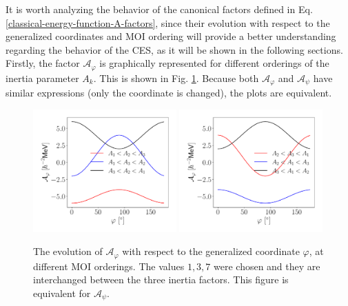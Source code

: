 It is worth analyzing the behavior of the canonical factors defined in Eq. \ref{classical-energy-function-A-factors}, since their evolution with respect to the generalized coordinates and MOI ordering will provide a better understanding regarding the behavior of the CES, as it will be shown in the following sections. Firstly, the factor $\mathcal{A}_\varphi$ is graphically represented for different orderings of the inertia parameter $A_k$. This is shown in Fig. \ref{fig-A-varphi-canonical}. Because both $\mathcal{A}_\varphi$ and $\mathcal{A}_\psi$ have similar expressions (only the coordinate is changed), the plots are equivalent.
\begin{figure}
    \centering
    \includegraphics[width=0.49\textwidth]{Chapters/Figures/A_varphi_1.pdf}
    \includegraphics[width=0.49\textwidth]{Chapters/Figures/A_varphi_2.pdf}
    \caption{The evolution of $\mathcal{A}_\varphi$ with respect to the generalized coordinate $\varphi$, at different MOI orderings. The values $1,3,7$ were chosen and they are interchanged between the three inertia factors. This figure is equivalent for $\mathcal{A}_\psi$.}
    \label{fig-A-varphi-canonical}
\end{figure}

